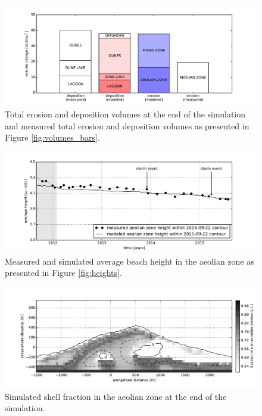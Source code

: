 \begin{figure}
  \centering
  \includegraphics[width=\columnwidth]{../Figures/model_volumes}
  \caption{Total erosion and deposition volumes at the end of the
    simulation and measured total erosion and deposition volumes as
    presented in Figure \ref{fig:volumes_bars}.}
  \label{fig:volumes_bars_model}
\end{figure}

\begin{figure}
  \centering
  \includegraphics[width=\columnwidth]{../Figures/model_heights}
  \caption{Measured and simulated average beach height in the aeolian
    zone as presented in Figure \ref{fig:heights}.}
  \label{fig:heights_model}
\end{figure}

\begin{figure}
  \centering
  \includegraphics[width=\columnwidth]{../Figures/model_shellfraction}
  \caption{Simulated shell fraction in the aeolian zone at the end of
    the simulation.}
  \label{fig:shellfraction_model}
\end{figure}

